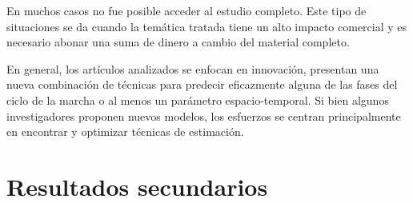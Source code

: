 En muchos casos no fue posible acceder al estudio completo. Este tipo de situaciones se da cuando la temática tratada tiene un alto impacto comercial y es necesario abonar una suma de dinero a cambio del material completo.

En general, los artículos analizados se enfocan en innovación, presentan una nueva combinación de técnicas para predecir eficazmente alguna de las fases del ciclo de la marcha o al menos un parámetro espacio-temporal. Si bien algunos investigadores proponen nuevos modelos, los esfuerzos se centran principalmente en encontrar y optimizar técnicas de estimación.

\section{Resultados secundarios}

